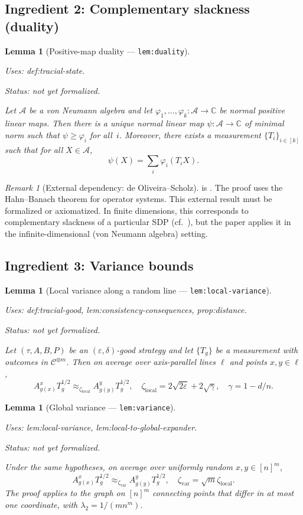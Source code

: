 \documentclass{article}
\providecommand{\uses}[1]{\par\smallskip\noindent\emph{Uses:} #1.\par\smallskip}
\providecommand{\notready}{\par\smallskip\noindent\emph{Status: not yet formalized.}\par\smallskip}
\newtheorem{lemma}[definition]{Lemma}
\theoremstyle{remark}
\newtheorem{remark}[definition]{Remark}
\newcommand{\C}{\mathbb{C}}
\newcommand{\code}{\mathcal{C}}
\newcommand{\algebra}{\mathcal{A}}
\newcommand{\eps}{\varepsilon}
\begin{document}
\subsection{Ingredient 2: Complementary slackness (duality)}

\begin{lemma}[Positive-map duality --- \texttt{lem:duality}]
	\label{lem:duality}
	\uses{def:tracial-state}
	\notready
	Let $\algebra$ be a von Neumann algebra and let
	$\varphi_1,\dots,\varphi_k\colon\algebra\to\C$ be normal positive linear
	maps. Then there is a unique normal linear map $\psi\colon\algebra\to\C$ of
	minimal norm such that $\psi\ge\varphi_i$ for all~$i$. Moreover, there
	exists a measurement $\{T_i\}_{i\in[k]}$ such that for all $X\in\algebra$,
	\[
		\psi(X)=\sum_i\varphi_i(T_i X).
	\]
\end{lemma}

\begin{remark}[External dependency: de Oliveira--Scholz]\label{rmk:duality-dep}
	 is \cite[Proposition~7.1]{de2021orthogonalization}.
	The proof uses the Hahn--Banach theorem for operator systems.
	This external result must be formalized or axiomatized.
	In finite dimensions, this corresponds to complementary slackness of a
	particular SDP (cf.\ \cite[Lemma~10]{natarajan2018two}), but the paper
	applies it in the infinite-dimensional (von Neumann algebra) setting.
\end{remark}

\subsection{Ingredient 3: Variance bounds}

\begin{lemma}[Local variance along a random line --- \texttt{lem:local-variance}]
	\label{lem:local-variance}
	\uses{def:tracial-good, lem:consistency-consequences, prop:distance}
	\notready
	Let $(\tau,A,B,P)$ be an $(\eps,\delta)$-good strategy and let $\{T_g\}$ be a
	measurement with outcomes in $\code^{\otimes m}$. Then on average over
	axis-parallel lines $\ell$ and points $x,y\in\ell$,
	\[
		A^x_{g(x)}T_g^{1/2}\approx_{\zeta_{\mathrm{local}}}
		A^y_{g(y)}T_g^{1/2},
		\quad
		\zeta_{\mathrm{local}}=2\sqrt{2\eps}+2\sqrt{\gamma},
		\quad
		\gamma=1-d/n.
	\]
\end{lemma}

\begin{lemma}[Global variance --- \texttt{lem:variance}]
	\label{lem:variance}
	\uses{lem:local-variance, lem:local-to-global-expander}
	\notready
	Under the same hypotheses, on average over uniformly random
	$x,y\in[n]^m$,
	\[
		A^x_{g(x)}T_g^{1/2}\approx_{\zeta_{\mathrm{var}}}
		A^y_{g(y)}T_g^{1/2},
		\quad
		\zeta_{\mathrm{var}}=\sqrt{m} \zeta_{\mathrm{local}}.
	\]
	The proof applies  to the graph on $[n]^m$
	connecting points that differ in at most one coordinate, with
	$\lambda_2=1/(mn^m)$.
\end{lemma}
\end{document}

